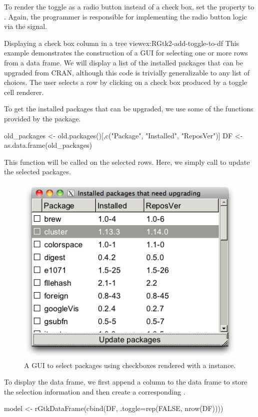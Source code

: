 To render the toggle as a radio button instead of a check box, set the
 property to . Again, the programmer is
responsible for implementing the radio button logic via the
 signal.

\begin{example}{Displaying a check box column in a tree
    view}{ex:RGtk2-add-toggle-to-df}
This example demonstrates the construction of a GUI for selecting one
or more rows from a data frame. We will display a list of the installed
packages that can be upgraded from CRAN, although this code is
trivially generalizable to any list of choices. The user selects a row
by clicking on a 
check box produced by a toggle cell renderer.






To get the installed packages that can be upgraded, we use some of the
functions provided by the   package.
\begin{Schunk}
\begin{Sinput}
 old_packages <- 
   old.packages()[,c("Package", "Installed", "ReposVer")]
 DF <- as.data.frame(old_packages)
\end{Sinput}
\end{Schunk}


This function will be called on the selected rows. Here, we simply
call  to update the selected packages.
\begin{Schunk}
\end{Schunk}

\begin{figure}
  \centering
  \includegraphics[width=.6\textwidth]{fig-RGtk2-add-toggle-to-df.png}
  \caption{A GUI to select packages using checkboxes rendered with a  instance.}
  \label{fig:RGtk2-add-toggle-to-df}
\end{figure}
To display the data frame, we first append a column to the data frame
to store the selection information and then create a corresponding
.
\begin{Schunk}
\begin{Sinput}
 model <- rGtkDataFrame(cbind(DF, .toggle=rep(FALSE, nrow(DF))))
\end{Sinput}
\end{Schunk}


\end{example}

